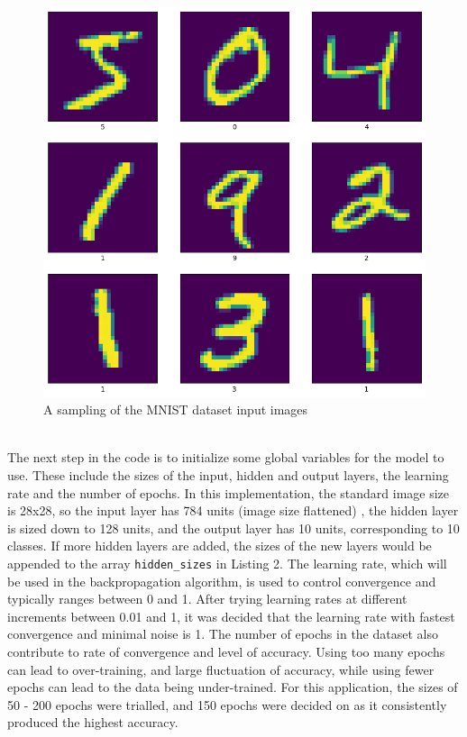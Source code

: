 \documentclass[twocolumn]{article}
\begin{document}
\begin{figure}[h!]
    \centering
    \includegraphics[scale=0.2]{MNIST_sampleset.png}
    \caption{A sampling of the MNIST dataset input images}
    \label{fig:enter-label}
\end{figure}
\\
The next step in the code is to initialize some global variables for the model to use. These include the sizes of the input, hidden and output layers, the learning rate and the number of epochs. In this implementation, the standard image size is 28x28, so the input layer has 784 units (image size flattened) \cite{nielsen1}, the hidden layer is sized down to 128 units, and the output layer has 10 units, corresponding to 10 classes. If more hidden layers are added, the sizes of the new layers would be appended to the array \texttt{hidden\_sizes} in Listing 2. The learning rate, which will be used in the backpropagation algorithm, is used to control convergence \cite{martens} and typically ranges between 0 and 1. After trying learning rates at different increments between 0.01 and 1, it was decided that the learning rate with fastest convergence and minimal noise is 1. The number of epochs in the dataset also contribute to rate of convergence and level of accuracy. Using too many epochs can lead to over-training, and large fluctuation of accuracy, while using fewer epochs can lead to the data being under-trained. For this application, the sizes of 50 - 200 epochs were trialled, and 150 epochs were decided on as it consistently produced the highest accuracy. 
\end{document}
